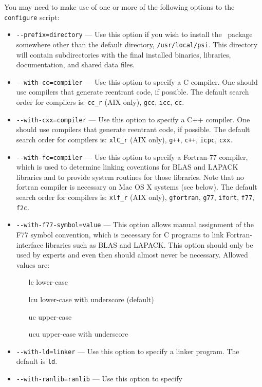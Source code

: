 \documentclass[12pt]{article}
\begin{document}
\noindent
You may need to make use of one or more of the following options to
the {\tt configure} script:
\begin{itemize}
\item {\tt -}{\tt -prefix=directory} --- Use this option if you wish to
  install the \PSIthree\ package somewhere other than the default
  directory, {\tt /usr/local/psi}.  This directory will contain
  subdirectories with the final installed binaries, libraries, 
  documentation, and shared data files.
\item {\tt -}{\tt -with-cc=compiler} --- Use this option to specify a
  C compiler.  One should use compilers that generate reentrant code,
  if possible.  The default search order for compilers is: {\tt cc\_r} (AIX
  only), {\tt gcc}, {\tt icc}, {\tt cc}.
\item {\tt -}{\tt -with-cxx=compiler} --- Use this option to specify a
  C++ compiler.  One should use compilers that generate reentrant
  code, if possible. The default search order for compilers is: {\tt xlC\_r}
  (AIX only), {\tt g++}, {\tt c++}, {\tt icpc}, {\tt cxx}.
\item {\tt -}{\tt -with-fc=compiler} --- Use this option to specify a
  Fortran-77 compiler, which is used to determine linking coventions
  for BLAS and LAPACK libraries and to provide system routines for
  those libraries.  Note that no fortran compiler is necessary on Mac
  OS X systems (see below).  The default search order for compilers
  is: {\tt xlf\_r} (AIX only), {\tt gfortran}, {\tt g77}, {\tt ifort},
  {\tt f77}, {\tt f2c}.
\item {\tt -}{\tt -with-f77-symbol=value} --- This option allows manual
  assignment of the F77 symbol convention, which is necessary for C
  programs to link Fortran-interface libraries such as BLAS and
  LAPACK. This option should only be used by experts and even then
  should almost never be necessary.  Allowed values are:
\begin{itemize}                            
\item[lc] lower-case
\item[lcu]lower-case with underscore (default)
\item[uc] upper-case
\item[ucu] upper-case with underscore
\end{itemize}
\item {\tt -}{\tt -with-ld=linker} --- Use this option to specify
  a linker program. The default is {\tt ld}.
\item {\tt -}{\tt -with-ranlib=ranlib} --- Use this option to specify

\end{itemize}
\end{document}
